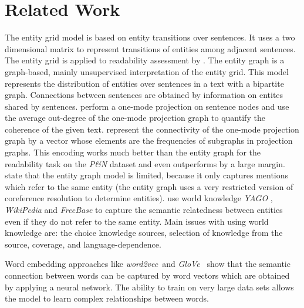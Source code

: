 \section{Related Work}
\label{sec:lcg_	related_work}
The entity grid model \cite{barzilay08} is based on entity transitions
over sentences. It uses a two dimensional matrix to represent
transitions of entities among adjacent sentences. The entity grid is
applied to readability assessment by . The entity
graph \cite{guinaudeau13} is a graph-based, mainly unsupervised
interpretation of the entity grid. This model represents the
distribution of entities over sentences in a text with a bipartite
graph. Connections between sentences are obtained by information on
entites shared by sentences.  perform a one-mode
projection on sentence nodes and use the average out-degree of
the one-mode projection graph to quantify the coherence of the given
text.  represent the connectivity of the one-mode
projection graph by a vector whose elements are the frequencies of
subgraphs in projection graphs. This encoding works much better
than the entity graph for the readability task on the \emph{P\&N}
dataset and even outperforms  by a large margin.
 state that the entity graph model is limited,
because it only captures mentions which refer to the same entity (the
entity graph uses a very restricted version of coreference resolution
to determine entities).  use world knowledge
\emph{YAGO} \cite{hoffart13}, \emph{WikiPedia} \cite{denoyer06} and
\emph{FreeBase} \cite{bollacker08} to capture the semantic relatedness
between entities even if they do not refer to the same entity. Main
issues with using world knowledge are: the choice knowledge sources, selection of knowledge from the source, coverage, and language-dependence.

Word embedding approaches like \emph{word2vec}\ and \emph{GloVe}\
\cite{mikolov13c,pennington14} show that the semantic connection
between words can be captured by word vectors which are obtained by
applying a neural network. The ability to train on very
large data sets allows the model to learn complex relationships
between words.

